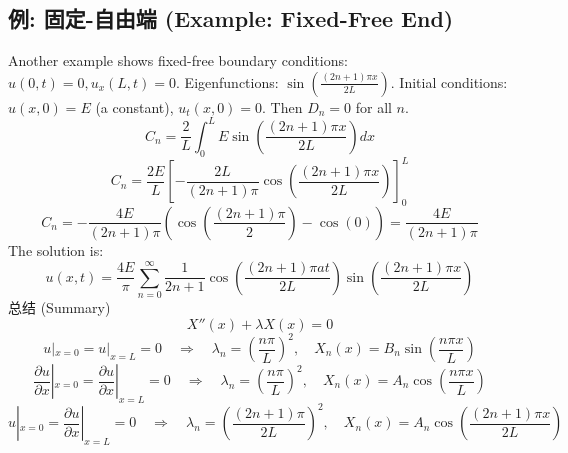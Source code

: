 \documentclass{article}
\begin{document}
	\subsection*{例: 固定-自由端 (Example: Fixed-Free End)}
	Another example shows fixed-free boundary conditions: $u(0,t)=0, u_x(L,t)=0$.
	Eigenfunctions: $\sin(\frac{(2n+1)\pi x}{2L})$.
	Initial conditions: $u(x,0)=E$ (a constant), $u_t(x,0)=0$.
	Then $D_n=0$ for all $n$.
	$$ C_n = \frac{2}{L} \int_0^L E \sin\left(\frac{(2n+1)\pi x}{2L}\right) dx $$
	$$ C_n = \frac{2E}{L} \left[-\frac{2L}{(2n+1)\pi} \cos\left(\frac{(2n+1)\pi x}{2L}\right) \right]_0^L $$
	$$ C_n = -\frac{4E}{(2n+1)\pi} (\cos(\frac{(2n+1)\pi}{2}) - \cos(0)) = \frac{4E}{(2n+1)\pi} $$
	The solution is:
	$$ u(x,t) = \frac{4E}{\pi} \sum_{n=0}^{\infty} \frac{1}{2n+1} \cos\left(\frac{(2n+1)\pi a t}{2L}\right) \sin\left(\frac{(2n+1)\pi x}{2L}\right) $$
	总结 (Summary)
	$$
	X''(x) + \lambda X(x) = 0
	$$
	$$
	u|_{x=0} = u|_{x=L} = 0 \quad \Rightarrow \quad \lambda_n = (\frac{n\pi}{L})^2, \quad X_n(x) = B_n \sin(\frac{n\pi x}{L})
	$$
	$$
	\frac{\partial u}{\partial x}|_{x=0} = \frac{\partial u}{\partial x}|_{x=L} = 0 \quad \Rightarrow \quad \lambda_n = (\frac{n\pi}{L})^2, \quad X_n(x) = A_n \cos(\frac{n\pi x}{L})
	$$
	$$
	u|_{x=0} = \frac{\partial u}{\partial x}|_{x=L} = 0 \quad \Rightarrow \quad \lambda_n = (\frac{(2n+1)\pi}{2L})^2, \quad X_n(x) = A_n \cos(\frac{(2n+1)\pi x}{2L})
	$$
	
\end{document}
